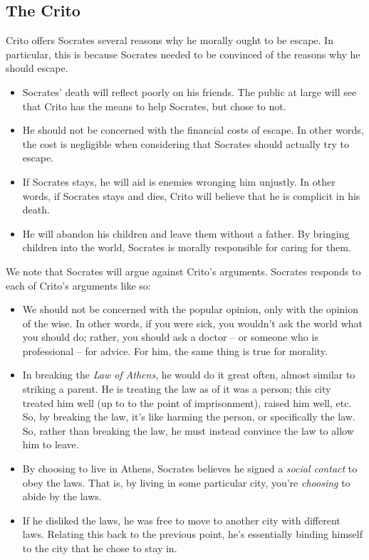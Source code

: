 \documentclass[letterpaper]{article}
\begin{document}
\subsection{The Crito}
Crito offers Socrates several reasons why he morally ought to be escape. In particular, this is because Socrates needed to be convinced of the reasons why he should escape. 
\begin{itemize}
    \item Socrates' death will reflect poorly on his friends. The public at large will see that Crito has the means to help Socrates, but chose to not.
    \item He should not be concerned with the financial costs of escape. In other words, the cost is negligible when considering that Socrates should actually try to escape.
    \item If Socrates stays, he will aid is enemies wronging him unjustly. In other words, if Socrates stays and dies, Crito will believe that he is complicit in his death. 
    \item He will abandon his children and leave them without a father. By bringing children into the world, Socrates is morally responsible for caring for them. 
\end{itemize}
We note that Socrates will argue against Crito's arguments. Socrates responds to each of Crito's arguments like so: 
\begin{itemize}
    \item We should not be concerned with the popular opinion, only with the opinion of the wise. In other words, if you were sick, you wouldn't ask the world what you should do; rather, you should ask a doctor -- or someone who is professional -- for advice. For him, the same thing is true for morality. 
    \item In breaking the \emph{Law of Athens}, he would do it great often, almost similar to striking a parent. He is treating the law as of it was a person; this city treated him well (up to to the point of imprisonment), raised him well, etc. So, by breaking the law, it's like harming the person, or specifically the law. So, rather than breaking the law, he must instead convince the law to allow him to leave.
    \item By choosing to live in Athens, Socrates believes he signed a \emph{social contact} to obey the laws. That is, by living in some particular city, you're \emph{choosing} to abide by the laws.
    \item If he disliked the laws, he was free to move to another city with different laws. Relating this back to the previous point, he's essentially binding himself to the city that he chose to stay in.  
\end{itemize}
\end{document}
